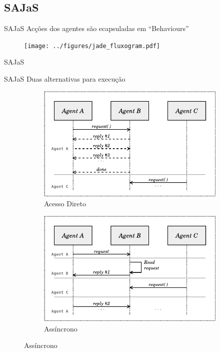 
\subsection{SAJaS}
\begin{frame}{SAJaS}
	Acções dos agentes são ecapsuladas em ``Behaviours''
	\begin{figure}[h]
		\centering
		\texttt{[image: ../figures/jade\_fluxogram.pdf]}
		\label{fig:jade_fluxogram}
	\end{figure}
\end{frame}
\begin{frame}{SAJaS}
	
\end{frame}
\begin{frame}{SAJaS}
	Duas alternativas para execução
	\begin{figure}[H]
		\centering
	    \begin{subfigure}[b]{.45\linewidth}
			\centering
			\includegraphics[width=\linewidth]{../figures/executionProblem.pdf}
			\caption{\small Acesso Direto}
			\label{fig:direct_method_execution}
	    \end{subfigure}
	    \begin{subfigure}[b]{.45\linewidth}
			\centering
			\includegraphics[width=\linewidth]{../figures/executionProblem2.pdf}
			\caption{\small Assíncrono}
			\label{fig:assynch_execution}
	    \end{subfigure}
	    \label{fig:execution_problems}
	\end{figure}

\end{frame}
